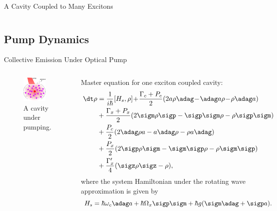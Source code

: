 \documentclass{beamer}
\begin{document}
\begin{frame}{A Cavity Coupled to Many Excitons}
\begin{columns}
\end{columns}
\end{frame}

\subsection{Pump Dynamics}

\begin{frame}{Collective Emission Under Optical Pump}
\begin{columns}
\begin{figure}[htp]%
\centering
\begin{center}
\includegraphics[width=0.8\textwidth]{./Figs/Cavity_pump}
\end{center}
\caption[Pumping a cavity.]{\fontsize{8}{-0.2}\selectfont A cavity under pumping.}
\label{pumpcavity}
\end{figure}

\fontsize{8}{-0.2}\selectfont 
Master equation for one exciton coupled cavity:
\begin{equation}
\begin{split}
  \dt \rho & = \frac{1}{i\hbar}[H_s,\rho]\! +\! \frac{\Gamma_c+P_c}{2}(2a\rho\adag\! -\! \adag a\rho\! -\! \rho\adag a)\\
& +\frac{\Gamma_x+P_x}{2}(2\sigm\rho\sigp - \sigp\sigm\rho - \rho\sigp\sigm ) \\
& +\frac{P_c}{2}(2\adag\rho a - a \adag\rho - \rho a\adag) \\
&+ \frac{P_x}{2} (2\sigp\rho\sigm - \sigm\sigp\rho - \rho\sigm\sigp )\\
&+\frac{\Gamma_x^{\prime}}{4} (\sigz\rho\sigz-\rho),\nonumber
 \end{split}
\end{equation}
where the system Hamiltonian under the rotating wave approximation is given by
\begin{equation}
 H_s=\hbar\omega_c \adag a+ \hbar \Omega_x \sigp\sigm +\hbar g(\sigm \adag+\sigp a).\nonumber
\end{equation}
\end{columns}


\end{frame}
\end{document}
